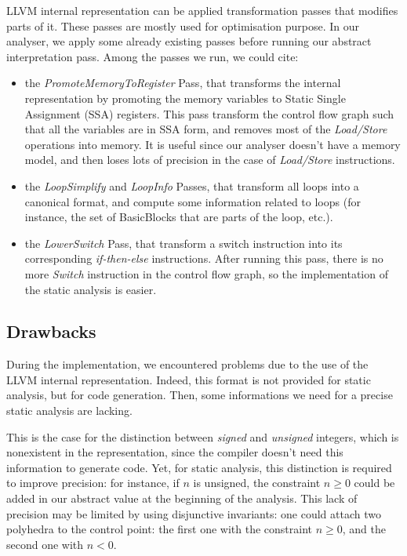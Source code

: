 \documentclass[a4paper,english,titlepage,11pt]{report}
\begin{document}
LLVM internal representation can be applied transformation passes that modifies
parts of it. These passes are mostly used for optimisation purpose. In our
analyser, we apply some already existing passes before running our 
abstract interpretation pass. Among the passes we run, we could cite:
\begin{itemize}
\item the \emph{PromoteMemoryToRegister} Pass, that transforms the internal
representation by promoting the memory variables to Static Single Assignment
(SSA) registers. This pass transform the control flow graph such that all the
variables are in SSA form, and removes most of the \emph{Load/Store} operations
into memory. It is useful since our analyser doesn't have a memory model, and
then loses lots of precision in the case of \emph{Load/Store} instructions.
\item the \emph{LoopSimplify} and \emph{LoopInfo} Passes, that transform all loops into a canonical
format, and compute some information related to loops (for instance, the set of
BasicBlocks that are parts of the loop, etc.).
\item the \emph{LowerSwitch} Pass, that transform a switch instruction into its
corresponding \emph{if-then-else} instructions. After running this pass, there
is no more \emph{Switch} instruction in the control flow graph, so the
implementation of the static analysis is easier.
\end{itemize}


\subsection{Drawbacks}

During the implementation, we encountered problems due to the use of the LLVM
internal representation. Indeed, this format is not provided for static
analysis, but for code generation. Then, some informations we need for a precise
static analysis are lacking.

This is the case for the distinction between \emph{signed} and \emph{unsigned}
integers, which is nonexistent in the representation, since the compiler doesn't
need this information to generate code. Yet, for static analysis, 
this distinction is required to improve precision:
for instance, if $n$ is unsigned, the constraint $n \geq 0$ could be added in
	our abstract value at the beginning of the analysis.
	This lack of precision may be limited by using disjunctive invariants: one
	could attach two polyhedra to the control point: the first one with the
	constraint $n \geq 0$, and the second one with $n < 0$.
\end{document}
